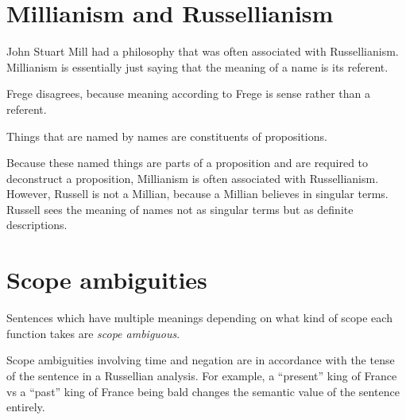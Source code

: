 \section{Millianism and Russellianism}

\begin{definition}[Millianism]
John Stuart Mill had a philosophy that was often associated with Russellianism. Millianism is essentially just saying that the meaning of a name is its referent.
\end{definition}

Frege disagrees, because meaning according to Frege is sense rather than a referent.

\begin{definition}[Russellianism]
Things that are named by names are constituents of propositions.
\end{definition}

Because these named things are parts of a proposition and are required to deconstruct a proposition, Millianism is often associated with Russellianism. However, Russell is not a Millian, because a Millian believes in singular terms. Russell sees the meaning of names not as singular terms but as definite descriptions.

\section{Scope ambiguities}

\begin{definition}
Sentences which have multiple meanings depending on what kind of scope each function takes are \emph{scope ambiguous}.
\end{definition}

Scope ambiguities involving time and negation are in accordance with the tense of the sentence in a Russellian analysis. For example, a ``present'' king of France vs a ``past'' king of France being bald changes the semantic value of the sentence entirely.
